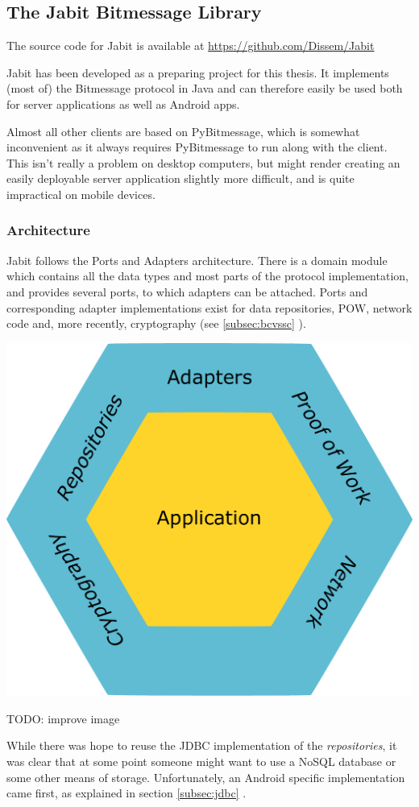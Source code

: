 \documentclass{bfh}
\begin{document}
  \subsection{The Jabit Bitmessage Library}
  The source code for Jabit is available at \url{https://github.com/Dissem/Jabit}

  Jabit has been developed as a preparing project for this thesis. It implements (most of) the Bitmessage protocol in Java and can therefore easily be used both for server applications as well as Android apps.

  Almost all other clients are based on PyBitmessage, which is somewhat inconvenient as it always requires PyBitmessage to run along with the client. This isn't really a problem on desktop computers, but might render creating  an easily deployable server application slightly more difficult, and is quite impractical on mobile devices.


  \subsubsection{Architecture}
  Jabit follows the Ports and Adapters architecture. There is a domain module which contains all the data types and most parts of the protocol implementation, and provides several ports, to which adapters can be attached. Ports and corresponding adapter implementations exist for data repositories, \ac{POW}, network code and, more recently, cryptography (see \ref{subsec:bcvssc} ).

  \begin{center}
    \includegraphics[width=0.5 \textwidth]{images/ports_and_adapters.pdf}
  \end{center}

TODO: improve image

  While there was hope to reuse the \acs{JDBC} implementation of the \textit{repositories}, it was clear that at some point someone might want to use a \acs{NoSQL} database or some other means of storage. Unfortunately, an Android specific implementation came first, as explained in section \ref{subsec:jdbc} .
\end{document}
